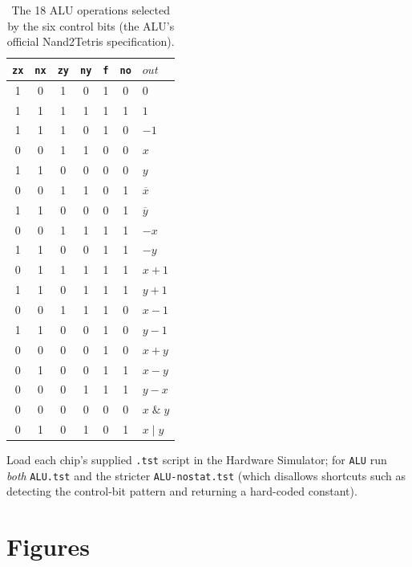 \documentclass[11pt]{article}
\begin{document}
\begin{table}[h]
\centering
\small
\begin{tabular}{@{}cccccc|l@{}}
\toprule
\texttt{zx} & \texttt{nx} & \texttt{zy} & \texttt{ny} & \texttt{f} & \texttt{no} & $out$ \\
\midrule
1 & 0 & 1 & 0 & 1 & 0 & $0$ \\
1 & 1 & 1 & 1 & 1 & 1 & $1$ \\
1 & 1 & 1 & 0 & 1 & 0 & $-1$ \\
0 & 0 & 1 & 1 & 0 & 0 & $x$ \\
1 & 1 & 0 & 0 & 0 & 0 & $y$ \\
0 & 0 & 1 & 1 & 0 & 1 & $\overline{x}$ \\
1 & 1 & 0 & 0 & 0 & 1 & $\overline{y}$ \\
0 & 0 & 1 & 1 & 1 & 1 & $-x$ \\
1 & 1 & 0 & 0 & 1 & 1 & $-y$ \\
0 & 1 & 1 & 1 & 1 & 1 & $x+1$ \\
1 & 1 & 0 & 1 & 1 & 1 & $y+1$ \\
0 & 0 & 1 & 1 & 1 & 0 & $x-1$ \\
1 & 1 & 0 & 0 & 1 & 0 & $y-1$ \\
0 & 0 & 0 & 0 & 1 & 0 & $x+y$ \\
0 & 1 & 0 & 0 & 1 & 1 & $x-y$ \\
0 & 0 & 0 & 1 & 1 & 1 & $y-x$ \\
0 & 0 & 0 & 0 & 0 & 0 & $x \;\&\; y$ \\
0 & 1 & 0 & 1 & 0 & 1 & $x \;|\; y$ \\
\bottomrule
\end{tabular}
\caption{The 18 ALU operations selected by the six control bits (the ALU's official Nand2Tetris specification).}
\label{tab:alu-ops}
\end{table}

Load each chip's supplied \texttt{.tst} script in the Hardware Simulator; for \texttt{ALU} run \emph{both} \texttt{ALU.tst} and the stricter \texttt{ALU-nostat.tst} (which disallows shortcuts such as detecting the control-bit pattern and returning a hard-coded constant).

\section{Figures}
\end{document}
